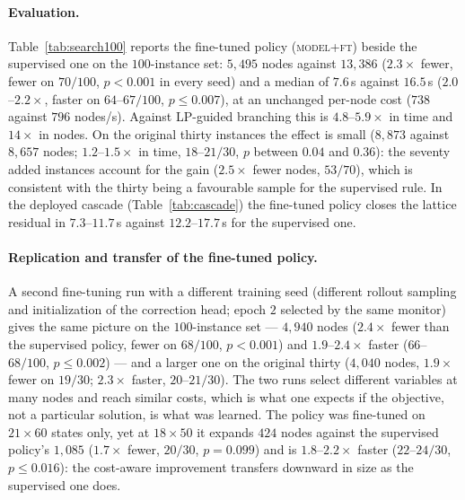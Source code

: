 \documentclass[final,5p,times,twocolumn]{elsarticle}
\begin{document}
\paragraph{Evaluation.} Table~\ref{tab:search100} reports the fine-tuned policy (\textsc{model+ft}) beside the supervised one on the $100$-instance set: $5{,}495$ nodes against $13{,}386$ ($2.3\times$ fewer, fewer on $70/100$, $p<0.001$ in every seed) and a median of $7.6$\,s against $16.5$\,s ($2.0$--$2.2\times$, faster on $64$--$67/100$, $p\le0.007$), at an unchanged per-node cost ($738$ against $796$ nodes/s). Against LP-guided branching this is $4.8$--$5.9\times$ in time and $14\times$ in nodes. On the original thirty instances the effect is small ($8{,}873$ against $8{,}657$ nodes; $1.2$--$1.5\times$ in time, $18$--$21/30$, $p$ between $0.04$ and $0.36$): the seventy added instances account for the gain ($2.5\times$ fewer nodes, $53/70$), which is consistent with the thirty being a favourable sample for the supervised rule. In the deployed cascade (Table~\ref{tab:cascade}) the fine-tuned policy closes the lattice residual in $7.3$--$11.7$\,s against $12.2$--$17.7$\,s for the supervised one.
\paragraph{Replication and transfer of the fine-tuned policy.} A second fine-tuning run with a different training seed (different rollout sampling and initialization of the correction head; epoch $2$ selected by the same monitor) gives the same picture on the $100$-instance set --- $4{,}940$ nodes ($2.4\times$ fewer than the supervised policy, fewer on $68/100$, $p<0.001$) and $1.9$--$2.4\times$ faster ($66$--$68/100$, $p\le0.002$) --- and a larger one on the original thirty ($4{,}040$ nodes, $1.9\times$ fewer on $19/30$; $2.3\times$ faster, $20$--$21/30$). The two runs select different variables at many nodes and reach similar costs, which is what one expects if the objective, not a particular solution, is what was learned. The policy was fine-tuned on $21\times60$ states only, yet at $18\times50$ it expands $424$ nodes against the supervised policy's $1{,}085$ ($1.7\times$ fewer, $20/30$, $p=0.099$) and is $1.8$--$2.2\times$ faster ($22$--$24/30$, $p\le0.016$): the cost-aware improvement transfers downward in size as the supervised one does.
\end{document}
